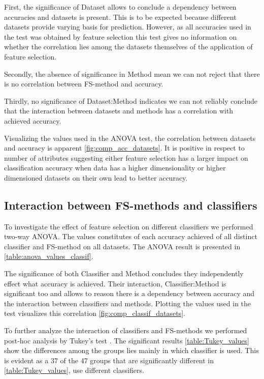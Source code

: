 First, the significance of Dataset allows to conclude a dependency between accuracies and datasets is present. This is to be expected because different datasets provide varying basis for prediction. However, as all accuracies used in the test was obtained by feature selection this test gives no information on whether the correlation lies among the datasets themselves of the application of feature selection.

Secondly, the absence of significance in Method mean we can not reject that there is no correlation between FS-method and accuracy.

Thirdly, no significance of Dataset:Method indicates we can not reliably conclude that the interaction between datasets and methods has a correlation with achieved accuracy.

Visualizing the values used in the ANOVA test, the correlation between datasets and accuracy is apparent \ref{fig:comp_acc_datasets}. It is positive in respect to number of attributes suggesting either feature selection has a larger impact on classification accuracy when data has a higher dimensionality or higher dimensioned datasets on their own lead to better accuracy.



\subsection{Interaction between FS-methods and classifiers}
\label{sec:fs_methods_classifiers}

To investigate the effect of feature selection on different classifiers we performed two-way ANOVA. The values constitutes of each accuracy achieved of all distinct classifier and FS-method on all datasets. The ANOVA result is presented in \ref{table:anova_values_classif}.



The significance of both Classifier and Method concludes they independently effect what accuracy is achieved. Their interaction, Classifier:Method is significant too and allows to reason there is a dependency between accuracy and the interaction between classifiers and methods. Plotting the values used in the test visualizes this correlation \ref{fig:comp_classif_datasets}.

To further analyze the interaction of classifiers and FS-methods we performed post-hoc analysis by Tukey's test \parencite{Haynes2013}. The significant results \ref{table:Tukey_values} show the differences among the groups lies mainly in which classifier is used. This is evident as a 37 of the 47 groups that are significantly different in \ref{table:Tukey_values}, use different classifiers.

